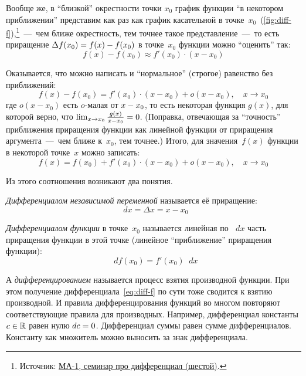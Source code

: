 \documentclass[a4paper,12pt]{article}
\newcommand{\diff}{\mathop{}\!d}
\begin{document}
  Вообще же, в ``близкой'' окрестности точки $x_0$ график функции ``в некотором приближении'' представим как раз как график касательной в точке~$x_0$~(\ref{fig:diff-f}),\footnote{
    Источник: \href{https://github.com/Alvant/Mathematichalys/tree/master}{МА-1, семинар про дифференциал (шестой)}.
  }~---~чем ближе окрестность, тем точнее такое представление~---~то есть приращение $\Delta f(x_0) \hm= f(x) \hm- f(x_0)$ в точке~$x_0$ функции можно ``оценить'' так:
  \[
    f(x) - f(x_0) \approx f'(x_0) \cdot (x - x_0)
  \]

  Оказывается, что можно написать и ``нормальное'' (строгое) равенство без приближений:
  \[
    f(x) - f(x_0) = f'(x_0) \cdot (x - x_0) + o(x - x_0),\quad x \to x_0
  \]
  где $o(x - x_0)$ есть $o$-малая от $x \hm- x_0$, то есть некоторая функция $g(x)$, для которой верно, что $\lim_{x \to x_0} \frac{g(x)}{x - x_0} \hm= 0$.
  (Поправка, отвечающая за ``точность'' приближения приращения функции как линейной функции от приращения аргумента~---~чем ближе к~$x_0$, тем точнее.)
  Итого, для значения~$f(x)$ функции в некоторой точке~$x$ можно записать:
  \[
    f(x) = f(x_0) + f'(x_0) \cdot (x - x_0) + o(x - x_0),\quad x \to x_0
  \]

  Из этого соотношения возникают два понятия.
  
  \emph{Дифференциалом независимой переменной} называется её приращение:
  \[
    \diff x = \Delta x = x - x_0
  \]

  \emph{Дифференциалом функции} в точке~$x_0$ называется линейная по $\diff x$ часть приращения функции в этой точке (линейное ``приближение'' приращения функции):
  \begin{equation}\label{eq:diff-f}
    \diff f(x_0) = f'(x_0) \diff x   %
  \end{equation}


  А \emph{дифференцированием} называется процесс взятия производной функции.
  При этом получение дифференциала~\eqref{eq:diff-f} по сути тоже сводится к взятию производной.
  И правила дифференцирования функций во многом повторяют соответствующие правила для производных.
  Например, дифференциал константы $c \hm\in \RR$ равен нулю $\diff c \hm= 0$.
  Дифференциал суммы равен сумме дифференциалов.
  Константу как множитель можно выносить за знак дифференциала.
  
\end{document}

